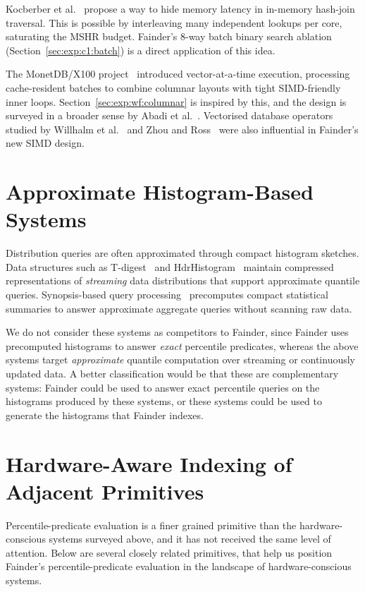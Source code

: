 Kocberber et al.~\cite{kocberber_2013} propose a way to hide memory latency in in-memory hash-join traversal. This is possible by interleaving many independent lookups per core, saturating the MSHR budget. Fainder's 8-way batch binary search ablation (Section~\ref{sec:exp:c1:batch}) is a direct application of this idea. 


The MonetDB/X100 project~\cite{boncz_2005} introduced vector-at-a-time execution, processing cache-resident batches to combine columnar layouts with tight SIMD-friendly inner loops.  Section~\ref{sec:exp:wf:columnar} is inspired by this, and the  design is surveyed in a broader sense by Abadi et al.~\cite{abadi_2008,abadi_2013}. Vectorised database operators studied by Willhalm et al.~\cite{willhalm_2009} and Zhou and Ross~\cite{zhou_ross_2002} were also influential in Fainder's new SIMD design.

\section{Approximate Histogram-Based Systems}

Distribution queries are often approximated through compact histogram sketches. Data structures such as T-digest~\cite{dunning_2019} and HdrHistogram~\cite{hdrhistogram} maintain compressed representations of \emph{streaming} data distributions that support approximate quantile queries. Synopsis-based query processing~\cite{ioannidis_2003,cormode_2011} precomputes compact statistical summaries to answer approximate aggregate queries without scanning raw data.

We do not consider these systems as competitors to Fainder, since Fainder uses precomputed histograms to answer \emph{exact} percentile predicates, whereas the above systems target \emph{approximate} quantile computation over streaming or continuously updated data. A better classification would be that these are complementary systems: Fainder could be used to answer exact percentile queries on the histograms produced by these systems, or these systems could be used to generate the histograms that Fainder indexes.

\section{Hardware-Aware Indexing of Adjacent Primitives}

Percentile-predicate evaluation is a finer grained primitive than the hardware-conscious systems surveyed above, and it has not received the same level of attention. Below are several closely related primitives, that help us position Fainder's percentile-predicate evaluation in the landscape of hardware-conscious systems.

